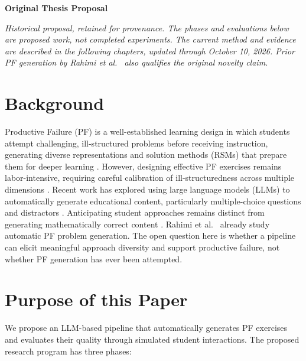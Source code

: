 \begin{center}
    {\Large \textbf{Original Thesis Proposal}}
\end{center}
\vspace{0.4cm}
\noindent\textit{Historical proposal, retained for provenance. The phases and evaluations below are proposed work, not completed experiments. The current method and evidence are described in the following chapters, updated through October 10, 2026. Prior PF generation by Rahimi et al.~\cite{rahimi2025} also qualifies the original novelty claim.}

\section*{Background}
Productive Failure (PF) is a well-established learning design in which students attempt challenging, ill-structured problems before receiving instruction, generating diverse representations and solution methods (RSMs) that prepare them for deeper learning \cite{kapur2008,sinha2021}. However, designing effective PF exercises remains labor-intensive, requiring careful calibration of ill-structuredness across multiple dimensions \cite{kapur2009}. Recent work has explored using large language models (LLMs) to automatically generate educational content, particularly multiple-choice questions and distractors \cite{alhazmi2024}. Anticipating student approaches remains distinct from generating mathematically correct content \cite{feng2024,parikh2025}. Rahimi et al.~\cite{rahimi2025} already study automatic PF problem generation. The open question here is whether a pipeline can elicit meaningful approach diversity and support productive failure, not whether PF generation has ever been attempted.
\section*{Purpose of this Paper}

We propose an LLM-based pipeline that automatically generates PF exercises
and evaluates their quality through simulated student interactions.
The proposed research program has three phases:

